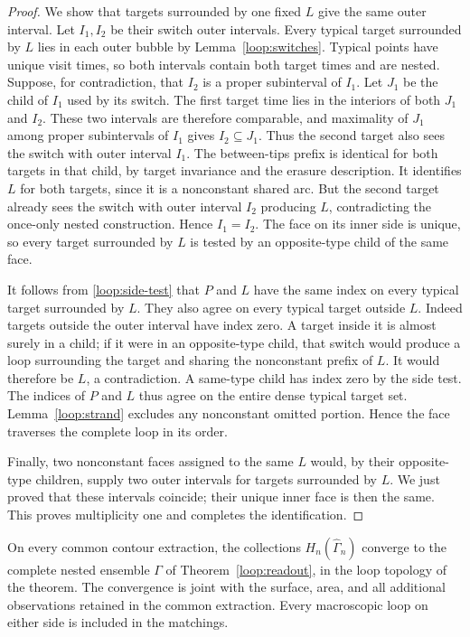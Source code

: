 \begin{proof}
We show that targets surrounded by one fixed $L$ give the same outer
interval.  Let $I_1,I_2$ be their switch outer intervals.  Every typical
target surrounded by $L$ lies in each outer bubble by
Lemma~\ref{loop:switches}.  Typical points have unique visit times,
so both intervals contain both target times and are nested.  Suppose,
for contradiction, that $I_2$ is a proper subinterval of $I_1$.
Let $J_1$ be the child of $I_1$ used by its switch.  The first target
time lies in the interiors of both $J_1$ and $I_2$.  These two
intervals are therefore comparable, and maximality of $J_1$ among
proper subintervals of $I_1$ gives $I_2\subseteq J_1$.  Thus the
second target also sees the switch
with outer interval $I_1$.  The between-tips prefix is identical for
both targets in that child, by target invariance and the erasure
description.  It identifies $L$ for both targets, since it is a
nonconstant shared arc.  But the second target already sees the
switch with outer interval $I_2$ producing $L$, contradicting the
once-only nested construction.  Hence $I_1=I_2$.  The face on its
inner side is unique, so every target surrounded by $L$ is tested
by an opposite-type child of the same face.

It follows from \eqref{loop:side-test} that $P$ and $L$ have the
same index on every typical target surrounded by $L$.  They also
agree on every typical target outside $L$.  Indeed targets outside
the outer interval have index zero.  A target inside it is almost
surely in a child; if it were in an opposite-type child, that switch
would produce a loop surrounding the target and sharing the
nonconstant prefix of $L$.  It would therefore be $L$, a
contradiction.  A same-type child has index zero by the side test.
The indices of $P$ and $L$ thus agree on the entire dense typical
target set.  Lemma~\ref{loop:strand} excludes any nonconstant omitted
portion.  Hence the face traverses the complete loop in its order.

Finally, two nonconstant faces assigned to the same $L$ would, by
their opposite-type children, supply two outer intervals for targets
surrounded by $L$.  We just proved that these intervals coincide;
their unique inner face is then the same.  This proves multiplicity
one and completes the identification.
\end{proof}

\begin{corollary}
\label{loop:matching}
On every common contour extraction, the collections $H_n(\widehat\Gamma_n)$
converge to the complete nested ensemble $\Gamma$ of
Theorem~\ref{loop:readout}, in the loop topology of the theorem.
The convergence is joint with the surface, area, and all additional
observations retained in the common extraction.  Every macroscopic loop on either
side is included in the matchings.
\end{corollary}

